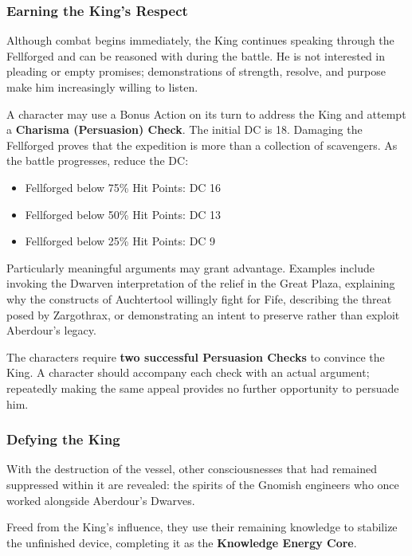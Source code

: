 \subsubsection*{Earning the King's Respect}
{\entryfont Although combat begins immediately, the King continues speaking through the Fellforged and can be reasoned with during the battle. He is not interested in pleading or empty promises; demonstrations of strength, resolve, and purpose make him increasingly willing to listen.

A character may use a Bonus Action on its turn to address the King and attempt a \textbf{Charisma (Persuasion) Check}. The initial DC is 18. Damaging the Fellforged proves that the expedition is more than a collection of scavengers. As the battle progresses, reduce the DC:
\begin{itemize}
	\item Fellforged below 75\% Hit Points: DC 16
	\item Fellforged below 50\% Hit Points: DC 13
	\item Fellforged below 25\% Hit Points: DC 9
\end{itemize}
Particularly meaningful arguments may grant advantage. Examples include invoking the Dwarven interpretation of the relief in the Great Plaza, explaining why the constructs of Auchtertool willingly fight for Fife, describing the threat posed by Zargothrax, or demonstrating an intent to preserve rather than exploit Aberdour's legacy.

The characters require \textbf{two successful Persuasion Checks} to convince the King. A character should accompany each check with an actual argument; repeatedly making the same appeal provides no further opportunity to persuade him.}
\subsubsection*{Defying the King}
{\entryfont With the destruction of the vessel, other consciousnesses that had remained suppressed within it are revealed: the spirits of the Gnomish engineers who once worked alongside Aberdour's Dwarves.

Freed from the King's influence, they use their remaining knowledge to stabilize the unfinished device, completing it as the \textbf{Knowledge Energy Core}.}

